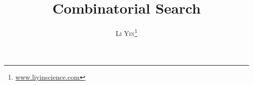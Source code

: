 \documentclass[a4paper,11pt]{book}
\title{\Huge \textbf{Combinatorial Search}}
\author{\textsc{Li Yin}\thanks{\url{www.liyinscience.com}}}
\begin{document}
\frontmatter
\maketitle

\label{chapter_advanced_linear_search}



% 

% 


% 


% 


% 

% 
\end{document}
